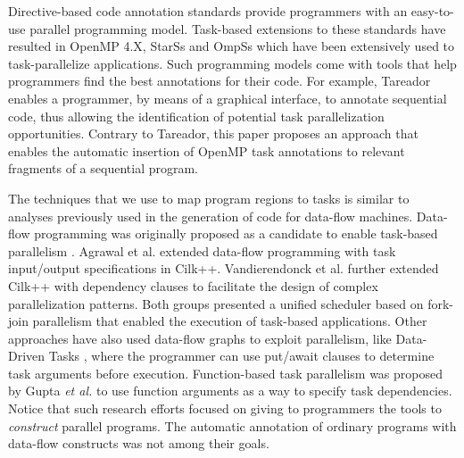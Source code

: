 \documentclass[sigplan,10pt,review,anonymous]{acmart}
\begin{document}
Directive-based code annotation standards provide programmers with an easy-to-use
parallel programming model.
Task-based extensions to these standards have resulted in OpenMP 4.X,
StarSs \cite{bellens:sc:2006, perez:iccc:2008, planas:hpca:2009,
tejedor:hpdc:2011} and OmpSs \cite{bueno:icpp:2011, duran:ppl:2011}  which have
been extensively used to task-parallelize applications. Such
programming models come with tools that help programmers find the
best annotations for their code. For example,  Tareador
\cite{Ayguade15} enables a programmer, by means of a graphical interface,
to annotate sequential code, thus allowing the identification of potential task
parallelization opportunities.
Contrary to Tareador,  this paper proposes an approach that enables the
automatic insertion of OpenMP task annotations to relevant fragments of a
sequential program.

The techniques that we use to map program regions to tasks is similar to
analyses previously used in the generation of code for data-flow machines.
Data-flow programming was originally proposed as a candidate to enable
task-based parallelism \cite{agrawal:ipdps:2010, chan:spaa:2007,
gupta:micro:2011}.  Agrawal et al. \cite{agrawal:ipdps:2010}  extended
data-flow programming  with task input/output specifications in  Cilk++.
Vandierendonck et al.  \cite{vandierendonck:hotpar:2011} further extended Cilk++
with dependency clauses to facilitate the design of complex
parallelization patterns. Both groups presented a unified scheduler based on
fork-join parallelism \cite{vandierendonck:pact:2011} that enabled the
execution of task-based applications. Other approaches have also used
data-flow graphs to exploit parallelism, like Data-Driven Tasks
\cite{tasirlar:icpp:2011}, where the programmer can use put/await clauses to
determine task arguments before execution.
Function-based task parallelism was proposed by Gupta {\em et al.}
\cite{gupta:micro:2011} to use function arguments  as a way to
specify task  dependencies.
Notice that such research efforts focused on giving to programmers the tools to
{\em construct} parallel programs.
The automatic annotation of ordinary programs with data-flow constructs was not
among their goals.
\end{document}
